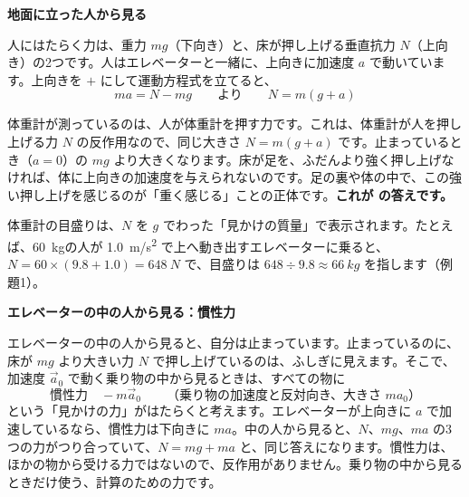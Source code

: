 \noindent\textbf{地面に立った人から見る}\par
\noindent\begin{minipage}[c]{0.36\linewidth}\centering
{}
\end{minipage}\hfill
\begin{minipage}[c]{0.6\linewidth}
人にはたらく力は、重力 $mg$（下向き）と、床が押し上げる垂直抗力 $N$（上向き）の2つです。人はエレベーターと一緒に、上向きに加速度 $a$ で動いています。上向きを $+$ にして運動方程式を立てると、
\[ ma=N-mg\qquad\text{より}\qquad N=m(g+a) \]
\end{minipage}

\par\vspace{3pt}
体重計が測っているのは、人が体重計を押す力です。これは、体重計が人を押し上げる力 $N$ の反作用なので、同じ大きさ $N=m(g+a)$ です。止まっているとき（$a=0$）の $mg$ より大きくなります。床が足を、ふだんより強く押し上げなければ、体に上向きの加速度を与えられないのです。足の裏や体の中で、この強い押し上げを感じるのが「重く感じる」ことの正体です。\textbf{これが \bkhatenaref の答えです。}

体重計の目盛りは、$N$ を $g$ でわった「見かけの質量」で表示されます。たとえば、\qty{60}{kg}の人が \qty{1.0}{m/s^2} で上へ動き出すエレベーターに乗ると、$N=60\times(9.8+1.0)=\qty{648}{N}$ で、目盛りは $648\div9.8\approx\qty{66}{kg}$ を指します（例題1）。

\noindent\textbf{エレベーターの中の人から見る：慣性力}\par
\noindent エレベーターの中の人から見ると、自分は止まっています。止まっているのに、床が $mg$ より大きい力 $N$ で押し上げているのは、ふしぎに見えます。そこで、加速度 $\vec a_0$ で動く乗り物の中から見るときは、すべての物に
\[ \text{慣性力}\quad -m\vec a_0\qquad\text{（乗り物の加速度と反対向き、大きさ } ma_0\text{）} \]
という「見かけの力」がはたらくと考えます。エレベーターが上向きに $a$ で加速しているなら、慣性力は下向きに $ma$。中の人から見ると、$N$、$mg$、$ma$ の3つの力がつり合っていて、$N=mg+ma$ と、同じ答えになります。慣性力は、ほかの物から受ける力ではないので、反作用がありません。乗り物の中から見るときだけ使う、計算のための力です。

